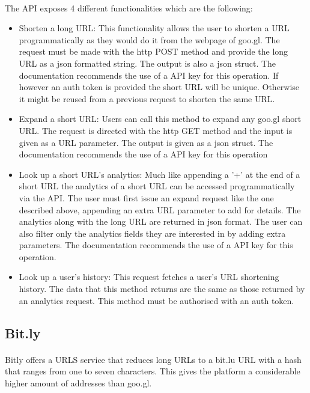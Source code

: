 \documentclass[12pt]{article}
\begin{document}
\paragraph{}
The API exposes 4 different functionalities which are the following: 

\begin{itemize}

\item {Shorten a long URL:  This functionality allows the user to shorten a URL programmatically as they would do it from the webpage of goo.gl. The request must be made with the http POST method and provide the long URL as a json formatted string. The output is also a json struct. The documentation recommends the use of a API key for this operation. If however an auth token is provided the short URL will be unique. Otherwise it might be reused from a previous request to shorten the same URL.}
\item {Expand a short URL: Users can call this method to expand any goo.gl short URL. The request is directed with the http GET method and the input is given as a URL parameter.  The output is given as a json struct. The documentation recommends the use of a API key for this operation}
\item {Look up a short URL's analytics: Much like appending a '+' at the end of a short URL the analytics of a short URL can be accessed programmatically via the API. The user must first issue an expand request like the one described above, appending an extra URL parameter to add for details. The analytics along with the long URL are returned in json format. The user can also filter only the analytics fields they are interested in by adding extra parameters. The documentation recommends the use of a API key for this operation.}
\item{Look up a user's history: This request fetches a user's URL shortening history. The data that this method returns are the same as those returned by an analytics request. This method must be authorised with an auth token.  }
\end{itemize}



\subsection{Bit.ly}

\paragraph{}
Bitly offers a URLS service that reduces long URLs to a bit.lu URL with a hash that ranges from one to seven characters. This gives the platform a considerable higher amount of addresses than goo.gl.
\end{document}
